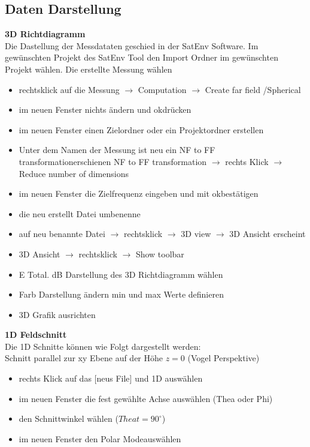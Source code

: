 \begin{itemize}
	\subsection{Daten Darstellung}
	\textbf{3D Richtdiagramm}\\
	Die Dastellung der Messdataten geschied in der SatEnv Software.  Im gewünschten Projekt des SatEnv Tool den Import Ordner im gewünschten Projekt wählen. Die erstellte Messung wählen
	\begin{itemize}
	\item rechtsklick auf die Messung $\rightarrow$ Computation $\rightarrow$ Create far field /Spherical 
	\item im neuen Fenster nichts ändern und \glqq ok\grqq drücken
	\item im neuen Fenster einen Zielordner  oder ein Projektordner erstellen
	\item Unter dem Namen der Messung ist neu ein \glqq NF to FF transformation\grqq erschienen
	 \glqq NF to FF transformation  \grqq $\rightarrow$ rechts Klick $\rightarrow$ Reduce number of dimensions
	\item  im neuen Fenster die Zielfrequenz eingeben und mit \glqq ok\grqq bestätigen
	\item  die neu erstellt Datei umbenenne 
	\item auf neu benannte Datei $\rightarrow$ rechtsklick $\rightarrow$ 3D view $\rightarrow$ 3D Ansicht erscheint 
	\item 3D Ansicht $\rightarrow$ rechtsklick $\rightarrow$ Show toolbar 
	\item E Total. dB Darstellung des 3D Richtdiagramm wählen
	\item Farb Darstellung ändern \glqq min \grqq und \glqq max \grqq Werte definieren
	\item 3D Grafik ausrichten
	\end{itemize}
	\textbf{1D Feldschnitt}\\
	Die 1D Schnitte können wie Folgt dargestellt werden:\\
	Schnitt parallel zur xy Ebene auf der Höhe $z=0$ (Vogel Perspektive)
	\begin{itemize}
	\item rechts Klick auf das [neus File]  und \glqq 1D \grqq auswählen
	\item im neuen Fenster die fest gewählte Achse auswählen (Thea oder Phi)
	\item den Schnittwinkel wählen ($Theat = 90^\circ$)
	\item im neuen Fenster den \glqq Polar Mode\grqq auswählen

\end{itemize}
\end{itemize}
